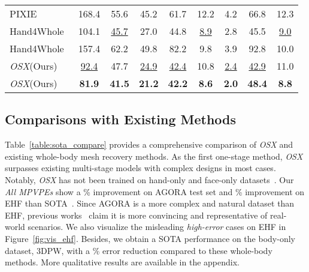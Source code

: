 \documentclass[10pt,twocolumn,letterpaper]{article}
\newcommand{\modelname}{\emph{OSX}\xspace}
\newcommand{\dataname}{\emph{UBody}\xspace}
\begin{document}
\begin{table*}[h]
\begin{center}
\begin{minipage}[t]{0.57\textwidth}
{\begin{tabular}{l|ccc|ccc|cc}
PIXIE~\cite{Feng_2021_pixie} &168.4 & 55.6 & 45.2 & 61.7 & 12.2  & 4.2 & 66.8	&12.3 \\
    Hand4Whole~\cite{GyeongsikMoon2020hand4whole} &104.1 & \underline{45.7} & 27.0 & 44.8 & \underline{8.9}  & 2.8 & 45.5&	\underline{9.0} \\
Hand4Whole~\cite{GyeongsikMoon2020hand4whole} &157.4 & 62.2 & 49.8 & 82.2 & 9.8  & 3.9 & 92.8&	10.0\\
    \midrule
    \modelname (Ours) & \underline{92.4} & 47.7  &\underline{24.9} & \underline{42.4}& 10.8 & \underline{2.4}  & \underline{42.9}&	11.0 \\
    \modelname (Ours) & \textbf{81.9}&	\textbf{41.5}&	\textbf{21.2}&\textbf{42.2}&\textbf{8.6}&	\textbf{2.0}&	\textbf{48.4}&	\textbf{8.8} \\
    \bottomrule
    \end{tabular}}
    \vspace{-0.2cm}
  \caption[Reconstruction errors on the proposed \dataname test set.]{Reconstruction errors on \dataname test set on the \emph{intra-scene} protocol. All models are pretrained on previous datasets, except for the results labeled by (i) : finetuned on the \dataname training data; (ii) : finetuned on the AGORA training data. The result of the \emph{inter-scene} setting is in the appendix.}
  \label{tab:3d_smplx_results}\end{minipage}
  \vspace{-0.9cm}
  \end{center}
\end{table*}

\subsection{Comparisons with Existing Methods}

Table~\ref{table:sota_compare} provides a comprehensive comparison of \modelname and existing whole-body mesh recovery methods. 
As the first one-stage method, \modelname surpasses existing multi-stage models with complex designs in most cases. Notably, \modelname has not been trained on hand-only and face-only datasets~\cite{Zimmermann_2019FreiHAND,TeroKarras2018ASG,GyeongsikMoon2020InterHand26MAD}. 
Our \emph{All MPVPEs} show a \% improvement on AGORA test set and \% improvement on EHF than SOTA~\cite{GyeongsikMoon2020hand4whole}.
Since AGORA is a more complex and natural dataset than EHF, previous works~\cite{GyeongsikMoon2020hand4whole,Patel_2021agora} claim it is more convincing and representative of real-world scenarios. We also visualize the misleading \emph{high-error} cases on EHF in Figure~\ref{fig:vis_ehf}.
Besides, we obtain a SOTA performance on the body-only dataset, 3DPW, with a \% error reduction compared to these whole-body methods. More qualitative results are available in the appendix.
\end{document}
